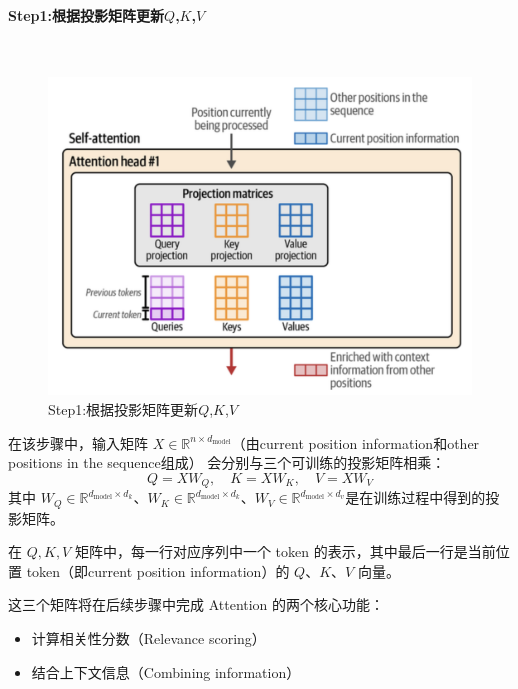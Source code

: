 \clearpage
\paragraph{Step1:根据投影矩阵更新$Q$,$K$,$V$}~{}
\begin{figure}[htbp]
  \centering
  \includegraphics[width=0.8\linewidth]{figs/lec2/lec2.13.png}
  \caption{Step1:根据投影矩阵更新$Q$,$K$,$V$}
  \label{fig:Step1:根据投影矩阵更新$Q$,$K$,$V$}
\end{figure}

在该步骤中，输入矩阵 $X \in \mathbb{R}^{n \times d_{\text{model}}}$（由{\color{dblue}current position information和other positions in the sequence}组成） 会分别与三个可训练的投影矩阵相乘：
\[
Q = X W_Q,\quad K = X W_K,\quad V = X W_V
\]
其中 $W_Q \in \mathbb{R}^{d_{\text{model}} \times d_k}$、$W_K \in \mathbb{R}^{d_{\text{model}} \times d_k}$、$W_V \in \mathbb{R}^{d_{\text{model}} \times d_v}$是在训练过程中得到的投影矩阵。

在 $Q, K, V$ 矩阵中，每一行对应序列中一个 token 的表示，其中最后一行是当前位置 token（即{\color{dblue}current position information}）的 $Q$、$K$、$V$ 向量。

这三个矩阵将在后续步骤中完成 Attention 的两个核心功能：
\begin{itemize}
  \item 计算相关性分数（Relevance scoring）
  \item 结合上下文信息（Combining information）
\end{itemize}

\clearpage
